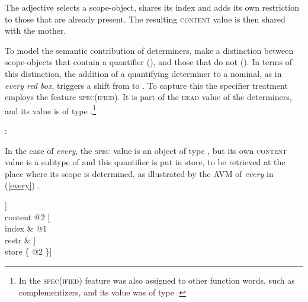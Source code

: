 \documentclass[output=paper
	        ,collection
	        ,collectionchapter
 	        ,biblatex
                ,babelshorthands
                ,newtxmath
                ,draftmode
                ,colorlinks, citecolor=brown
]{langscibook}
\begin{document}
\noindent
The adjective selects a scope-object, shares its index and adds its own 
restriction to those that are already present. The resulting \textsc{content} 
value is then shared with the mother.

\begin{sloppypar}
To model the semantic contribution of determiners, \citet[135--136]{GS00} 
make a distinction between scope-objects that contain a quantifier 
(), and those that do not (). 
In terms of this distinction, the addition of a quantifying determiner to a nominal, 
as in \emph{every red box}, triggers a shift from  to . 
To capture this the specifier treatment employs the feature \textsc{spec(ified)}. 
It is part of the \textsc{head} value of the determiners, and its value is of type 
 \citep[362]{GS00}.\footnote{In \citet[45]{ps2} the \textsc{spec(ified)}
feature was also assigned to other function words, such as complementizers, 
and its value was of type .}   
\end{sloppypar}

\begin{exe} 
\ex   {}: \begin{avm}  \end{avm}  
\end{exe} 

\noindent
In the case of \emph{every}, the \textsc{spec} value is an object of 
type , but its own \textsc{content} value is a subtype of 
 and this quantifier is put in store, to be retrieved 
at the place where its scope is determined, as illustrated by the AVM
of \emph{every} in (\ref{every}) \citep[204]{GS00}.  

\begin{exe} 
\ex\label{every} 
\begin{avm}
[category|head [\type{determiner}        \\
                spec [\type{parameter}   \\
                      index & @1           \\
                      restr & \avmbox{$\Sigma$} ]] \\
 content @2 [          \\
             index & @1                  \\
             restr & \avmbox{$\Sigma$} ] \\
 store \{ @2 \}]
\end{avm}
\end{exe}
\end{document}
